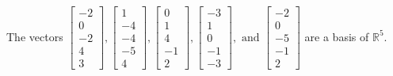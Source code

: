 \begin{exercise}
\begin{exerciseStatement}
  \end{exerciseStatement}
  \begin{exerciseAnswer}
   The vectors \(\left[\begin{array}{r}
-2 \\
0 \\
-2 \\
4 \\
3
\end{array}\right] , \left[\begin{array}{r}
1 \\
-4 \\
-4 \\
-5 \\
4
\end{array}\right] , \left[\begin{array}{r}
0 \\
1 \\
4 \\
-1 \\
2
\end{array}\right] , \left[\begin{array}{r}
-3 \\
1 \\
0 \\
-1 \\
-3
\end{array}\right] , \text{ and } \left[\begin{array}{r}
-2 \\
0 \\
-5 \\
-1 \\
2
\end{array}\right]\) 
  	 are  a basis of \(\mathbb{R}^5\).
  


  \end{exerciseAnswer}
\end{exercise}